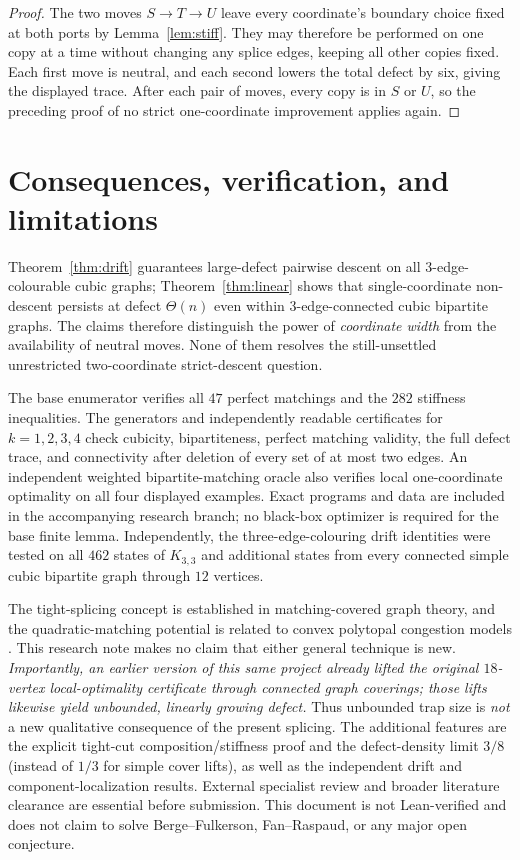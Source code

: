 \documentclass[11pt]{article}
\begin{document}
\begin{proof}
The two moves $S\to T\to U$ leave every coordinate's boundary choice fixed at both ports by Lemma~\ref{lem:stiff}. They may therefore be performed on one copy at a time without changing any splice edges, keeping all other copies fixed. Each first move is neutral, and each second lowers the total defect by six, giving the displayed trace. After each pair of moves, every copy is in $S$ or $U$, so the preceding proof of no strict one-coordinate improvement applies again.
\end{proof}

\section{Consequences, verification, and limitations}
Theorem~\ref{thm:drift} guarantees large-defect pairwise descent on all $3$-edge-colourable cubic graphs; Theorem~\ref{thm:linear} shows that single-coordinate non-descent persists at defect $\Theta(n)$ even within $3$-edge-connected cubic bipartite graphs. The claims therefore distinguish the power of \emph{coordinate width} from the availability of neutral moves. None of them resolves the still-unsettled unrestricted two-coordinate strict-descent question.

The base enumerator verifies all $47$ perfect matchings and the $282$ stiffness inequalities. The generators and independently readable certificates for $k=1,2,3,4$ check cubicity, bipartiteness, perfect matching validity, the full defect trace, and connectivity after deletion of every set of at most two edges. An independent weighted bipartite-matching oracle also verifies local one-coordinate optimality on all four displayed examples. Exact programs and data are included in the accompanying research branch; no black-box optimizer is required for the base finite lemma. Independently, the three-edge-colouring drift identities were tested on all $462$ states of $K_{3,3}$ and additional states from every connected simple cubic bipartite graph through $12$ vertices.

The tight-splicing concept is established in matching-covered graph theory, and the quadratic-matching potential is related to convex polytopal congestion models \cite{LuKothari2020,Harks2020,Murota2006}. This research note makes no claim that either general technique is new. \emph{Importantly, an earlier version of this same project already lifted the original $18$-vertex local-optimality certificate through connected graph coverings; those lifts likewise yield unbounded, linearly growing defect.} Thus unbounded trap size is \emph{not} a new qualitative consequence of the present splicing. The additional features are the explicit tight-cut composition/stiffness proof and the defect-density limit $3/8$ (instead of $1/3$ for simple cover lifts), as well as the independent drift and component-localization results. External specialist review and broader literature clearance are essential before submission. This document is not Lean-verified and does not claim to solve Berge--Fulkerson, Fan--Raspaud, or any major open conjecture.
\end{document}
